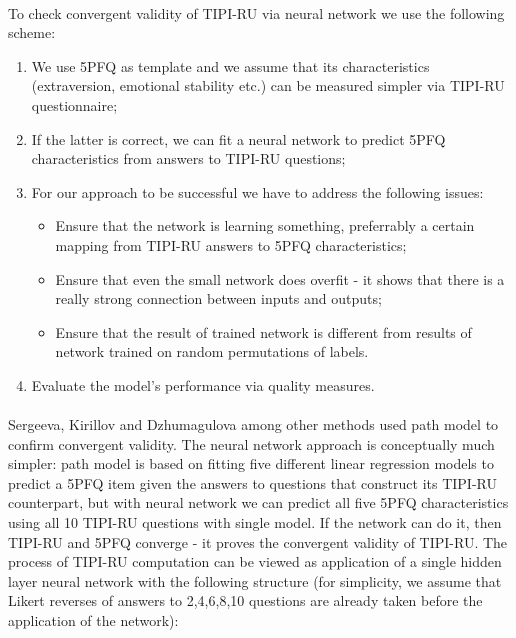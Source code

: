 \documentclass{llncs}
\begin{document}
\paragraph{}
To check convergent validity of TIPI-RU via neural network we use the following scheme:
\begin{enumerate}
	\item We use 5PFQ as template and we assume that its characteristics (extraversion, emotional stability etc.) can be measured simpler via TIPI-RU questionnaire;
	\item If the latter is correct, we can fit a neural network to predict 5PFQ characteristics from answers to TIPI-RU questions;
	\item For our approach to be successful we have to address the following issues:
	\begin{itemize}
		\item Ensure that the network is learning something, preferrably a certain mapping from TIPI-RU answers to 5PFQ characteristics;
		\item Ensure that even the small network does overfit - it shows that there is a really strong connection between inputs and outputs;
		\item Ensure that the result of trained network is different from results of network trained on random permutations of labels.
	\end{itemize}
	\item Evaluate the model's performance via quality measures.
\end{enumerate}
\paragraph{}
Sergeeva, Kirillov and Dzhumagulova among other methods used path model to confirm convergent validity. The neural network approach is conceptually much simpler: path model is based on fitting five different linear regression models to predict a 5PFQ item given the answers to questions that construct its TIPI-RU counterpart, but with neural network we can predict all five 5PFQ characteristics using all 10 TIPI-RU questions with single model. If the network can do it, then TIPI-RU and 5PFQ converge - it proves the convergent validity of TIPI-RU. The process of TIPI-RU computation can be viewed as application of a single hidden layer neural network with the following structure (for simplicity, we assume that Likert reverses of answers to 2,4,6,8,10 questions are already taken before the application of the network):
 
\end{document}
